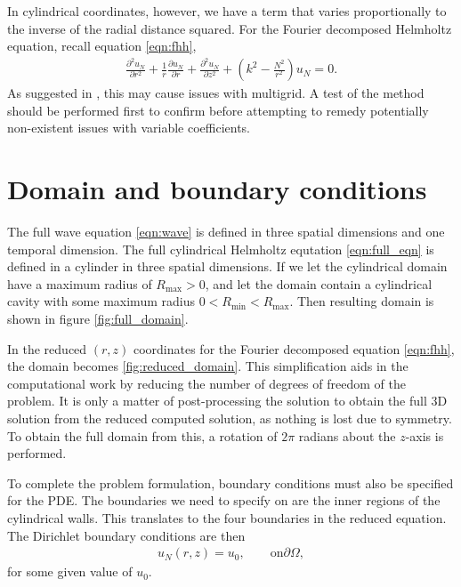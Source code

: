 In cylindrical coordinates, however, we have a term that varies proportionally to the inverse of the radial distance squared.
For the Fourier decomposed Helmholtz equation, recall equation \eqref{eqn:fhh},
\begin{align}
	\frac{\partial^2 u_N}{\partial r^2}
			 + \frac{1}{r} \frac{\partial u_N}{\partial r}
			 + \frac{\partial^2 u_N}{\partial z^2}
			 + (k^2 - \frac{N^2}{r^2})u_N = 0. \label{eqn:full_fhh}
\end{align}
As suggested in \cite{briggs}, this may cause issues with multigrid.
A test of the method should be performed first to confirm before attempting to remedy potentially non-existent issues with variable coefficients.










\section{Domain and boundary conditions}

The full wave equation \eqref{eqn:wave} is defined in three spatial dimensions and one temporal dimension.
The full cylindrical Helmholtz equtation \eqref{eqn:full_eqn} is defined in a cylinder in three spatial dimensions.
If we let the cylindrical domain have a maximum radius of $R_{\mathrm{max}} > 0$, and let the domain contain a cylindrical cavity with some maximum radius $0<R_{\mathrm{min}}<R_\mathrm{max}$.
Then resulting domain is shown in figure \ref{fig:full_domain}.

In the reduced $(r,z)$ coordinates for the Fourier decomposed equation \eqref{eqn:fhh}, the domain becomes \ref{fig:reduced_domain}.
This simplification aids in the computational work by reducing the number of degrees of freedom of the problem.
It is only a matter of post-processing the solution to obtain the full 3D solution from the reduced computed solution, as nothing is lost due to symmetry.
To obtain the full domain from this, a rotation of $2\pi$ radians about the $z$-axis is performed.

To complete the problem formulation, boundary conditions must also be specified for the PDE.
The boundaries we need to specify on are the inner regions of the cylindrical walls.
This translates to the four boundaries in the reduced equation.
The Dirichlet boundary conditions are then
\begin{align}
	u_N(r,z) = u_0, \qquad \mathrm{on} \partial \Omega,
\end{align}
for some given value of $u_0$.



